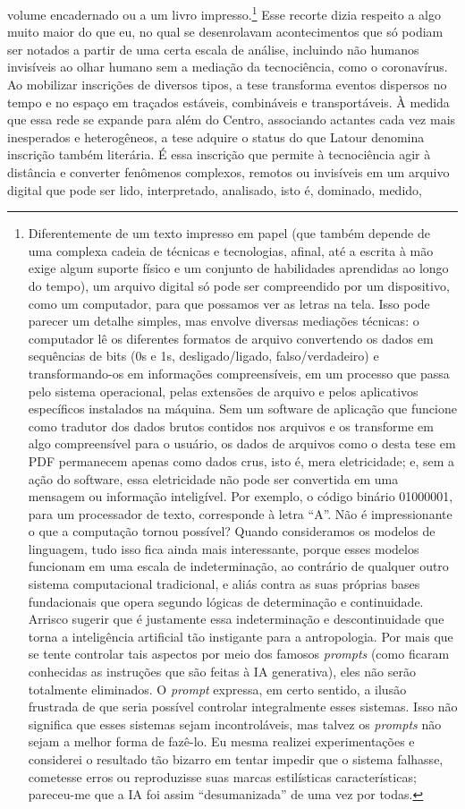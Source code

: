 volume encadernado ou a um livro impresso.\footnote{Diferentemente de um texto impresso em papel (que também depende de uma complexa cadeia de técnicas e tecnologias, afinal, até a escrita à mão exige algum suporte físico e um conjunto de habilidades aprendidas ao longo do tempo), um arquivo digital só pode ser compreendido por um dispositivo, como um computador, para que possamos ver as letras na tela. Isso pode parecer um detalhe simples, mas envolve diversas mediações técnicas: o computador lê os diferentes formatos de arquivo convertendo os dados em sequências de bits (0s e 1s, desligado/ligado, falso/verdadeiro) e transformando-os em informações compreensíveis, em um processo que passa pelo sistema operacional, pelas extensões de arquivo e pelos aplicativos específicos instalados na máquina. Sem um software de aplicação que funcione como tradutor dos dados brutos contidos nos arquivos e os transforme em algo compreensível para o usuário, os dados de arquivos como o desta tese em PDF permanecem apenas como dados crus, isto é, mera eletricidade; e, sem a ação do software, essa eletricidade não pode ser convertida em uma mensagem ou informação inteligível. Por exemplo, o código binário 01000001, para um processador de texto, corresponde à letra \enquote{A}. Não é impressionante o que a computação tornou possível? Quando consideramos os modelos de linguagem, tudo isso fica ainda mais interessante, porque esses modelos funcionam em uma escala de indeterminação, ao contrário de qualquer outro sistema computacional tradicional, e aliás contra as suas próprias bases fundacionais que opera segundo lógicas de determinação e continuidade. Arrisco sugerir que é justamente essa indeterminação e descontinuidade que torna a inteligência artificial tão instigante para a antropologia. Por mais que se tente controlar tais aspectos por meio dos famosos \textit{prompts} (como ficaram conhecidas as instruções que são feitas à IA generativa), eles não serão totalmente eliminados. O \textit{prompt} expressa, em certo sentido, a ilusão frustrada de que seria possível controlar integralmente esses sistemas. Isso não significa que esses sistemas sejam incontroláveis, mas talvez os \textit{prompts} não sejam a melhor forma de fazê-lo. Eu mesma realizei experimentações e considerei o resultado tão bizarro em tentar impedir que o sistema falhasse, cometesse erros ou reproduzisse suas marcas estilísticas características; pareceu-me que a IA foi assim \enquote{desumanizada} de uma vez por todas.} Esse recorte dizia respeito a algo muito maior do que eu, no qual se desenrolavam acontecimentos que só podiam ser notados a partir de uma certa escala de análise, incluindo não humanos invisíveis ao olhar humano sem a mediação da tecnociência, como o coronavírus. Ao mobilizar inscrições de diversos tipos, a tese transforma eventos dispersos no tempo e no espaço em traçados estáveis, combináveis e transportáveis. À medida que essa rede se expande para além do Centro, associando actantes cada vez mais inesperados e heterogêneos, a tese adquire o status do que Latour denomina inscrição também literária. É essa inscrição que permite à tecnociência agir à distância e converter fenômenos complexos, remotos ou invisíveis em um arquivo digital que pode ser lido, interpretado, analisado, isto é, dominado, medido, 